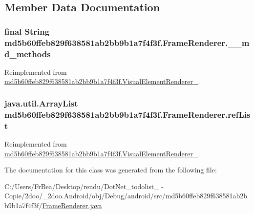 \subsection{Member Data Documentation}
\hypertarget{classmd5b60ffeb829f638581ab2bb9b1a7f4f3f_1_1_frame_renderer_d51663e7802471a9ec8a28e818f4c43f}{
\subsubsection[{\_\-\_\-md\_\-methods}]{\setlength{\rightskip}{0pt plus 5cm}final String {\bf md5b60ffeb829f638581ab2bb9b1a7f4f3f.FrameRenderer.\_\-\_\-md\_\-methods}}}
\label{classmd5b60ffeb829f638581ab2bb9b1a7f4f3f_1_1_frame_renderer_d51663e7802471a9ec8a28e818f4c43f}




Reimplemented from \hyperlink{classmd5b60ffeb829f638581ab2bb9b1a7f4f3f_1_1_visual_element_renderer__1_4ef182bc984a4330ed789e1f0b0222d1}{md5b60ffeb829f638581ab2bb9b1a7f4f3f.VisualElementRenderer\_}.\hypertarget{classmd5b60ffeb829f638581ab2bb9b1a7f4f3f_1_1_frame_renderer_21cc95191ee8ae27b886228f196f3939}{
\subsubsection[{refList}]{\setlength{\rightskip}{0pt plus 5cm}java.util.ArrayList {\bf md5b60ffeb829f638581ab2bb9b1a7f4f3f.FrameRenderer.refList}}}
\label{classmd5b60ffeb829f638581ab2bb9b1a7f4f3f_1_1_frame_renderer_21cc95191ee8ae27b886228f196f3939}




Reimplemented from \hyperlink{classmd5b60ffeb829f638581ab2bb9b1a7f4f3f_1_1_visual_element_renderer__1_4ebd0e42ebd360712eb189930036fc9f}{md5b60ffeb829f638581ab2bb9b1a7f4f3f.VisualElementRenderer\_}.

The documentation for this class was generated from the following file:\begin{CompactItemize}
\item 
C:/Users/FrBea/Desktop/rendu/DotNet\_\-todolist\_ - Copie/2doo/\_\-2doo.Android/obj/Debug/android/src/md5b60ffeb829f638581ab2bb9b1a7f4f3f/\hyperlink{md5b60ffeb829f638581ab2bb9b1a7f4f3f_2_frame_renderer_8java}{FrameRenderer.java}\end{CompactItemize}
